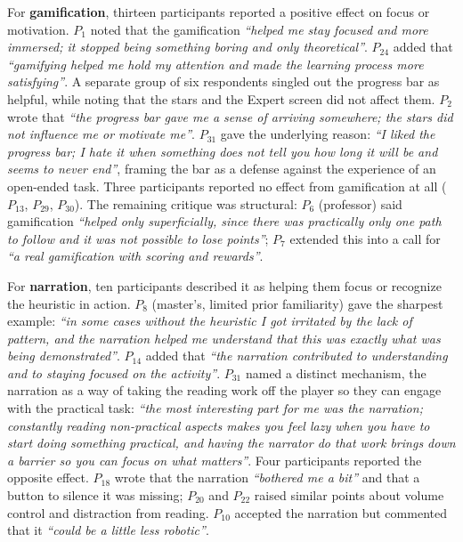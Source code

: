 For \textbf{gamification}, thirteen participants reported a positive effect on focus or motivation. $P_1$ noted that the gamification \textit{``helped me stay focused and more immersed; it stopped being something boring and only theoretical''}. $P_{24}$ added that \textit{``gamifying helped me hold my attention and made the learning process more satisfying''}. A separate group of six respondents singled out the progress bar as helpful, while noting that the stars and the Expert screen did not affect them. $P_2$ wrote that \textit{``the progress bar gave me a sense of arriving somewhere; the stars did not influence me or motivate me''}. $P_{31}$ gave the underlying reason: \textit{``I liked the progress bar; I hate it when something does not tell you how long it will be and seems to never end''}, framing the bar as a defense against the experience of an open-ended task. Three participants reported no effect from gamification at all ($P_{13}$, $P_{29}$, $P_{30}$). The remaining critique was structural: $P_6$ (professor) said gamification \textit{``helped only superficially, since there was practically only one path to follow and it was not possible to lose points''}; $P_7$ extended this into a call for \textit{``a real gamification with scoring and rewards''}.

For \textbf{narration}, ten participants described it as helping them focus or recognize the heuristic in action. $P_8$ (master's, limited prior familiarity) gave the sharpest example: \textit{``in some cases without the heuristic I got irritated by the lack of pattern, and the narration helped me understand that this was exactly what was being demonstrated''}. $P_{14}$ added that \textit{``the narration contributed to understanding and to staying focused on the activity''}. $P_{31}$ named a distinct mechanism, the narration as a way of taking the reading work off the player so they can engage with the practical task: \textit{``the most interesting part for me was the narration; constantly reading non-practical aspects makes you feel lazy when you have to start doing something practical, and having the narrator do that work brings down a barrier so you can focus on what matters''}. Four participants reported the opposite effect. $P_{18}$ wrote that the narration \textit{``bothered me a bit''} and that a button to silence it was missing; $P_{20}$ and $P_{22}$ raised similar points about volume control and distraction from reading. $P_{10}$ accepted the narration but commented that it \textit{``could be a little less robotic''}.

